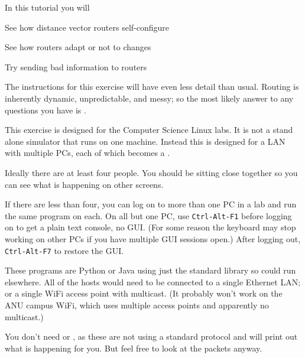 








In this tutorial you will

\DOT See how distance vector routers self-configure

\DOT See how routers adapt \DSH or not \DSH to changes

\DOT Try sending bad information to routers

\begin{IMPORTANT}
The instructions for this exercise will have even less detail
than usual. Routing is inherently dynamic, unpredictable, and
messy; so the most likely answer to any questions you have is
.
\end{IMPORTANT}



This exercise is designed for the Computer Science Linux labs.
It is not a stand alone simulator that runs on one machine.
Instead this is designed for a LAN with multiple PCs,
each of which becomes a .

Ideally there are at least four people. You should be sitting
close together so you can see what is happening on
other screens.

If there are less than four, you can log on to more than one
PC in a lab and run the same program on each. On all but one
PC, use \texttt{Ctrl-Alt-F1} before logging on to get
a plain text console, no GUI. (For some reason the keyboard
may stop working on other PCs if you have multiple GUI sessions
open.) After logging out, \texttt{Ctrl-Alt-F7} to restore
the GUI.

These programs are Python or Java using just the standard
library so could run elsewhere. All of the hosts would need
to be connected to a single Ethernet LAN; or a single WiFi access
point with multicast. (It probably won't work on the ANU campus
WiFi, which uses multiple access points and apparently no
multicast.)

You don't need  or , as these
 are not using a standard protocol and will print
out what is happening for you. But feel free to look at the
packets anyway.

